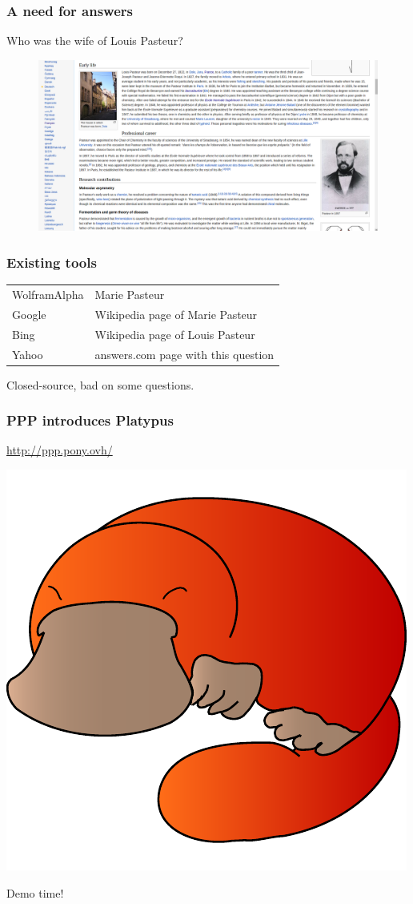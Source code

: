 \begin{frame}[fragile]
    \frametitle{A need for answers}
    Who was the wife of Louis Pasteur?
    \begin{figure}
        \includegraphics[width=\textwidth]{pasteurWiki.png}
    \end{figure}
\end{frame}

\begin{frame}[fragile]
    \frametitle{Existing tools}
    \begin{tabular}{ll}
        WolframAlpha & Marie Pasteur\\
        Google & Wikipedia page of Marie Pasteur\\
        Bing & Wikipedia page of Louis Pasteur\\
        Yahoo & answers.com page with this question
    \end{tabular}
\medbreak
\alert{Closed-source, bad on some questions.}
\end{frame}

\begin{frame}[fragile]
    \frametitle{PPP introduces Platypus}
    \begin{center}
        \url{http://ppp.pony.ovh/}
        
        \bigskip
        
        \includegraphics[width=0.6\linewidth]{figures/platypus.pdf}
    \end{center}
\end{frame}

\begin{frame}
    \begin{center}
        \Huge Demo time!
    \end{center}
\end{frame}
